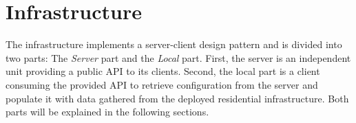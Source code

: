 
\chapter{Infrastructure}
\label{sec:infrastructure}

The infrastructure implements a server-client design pattern and is divided into two parts:
The \emph{Server} part and the \emph{Local} part.
First, the server is an independent unit providing a public API to its clients.
Second, the local part is a client consuming the provided API to retrieve configuration from the server and populate it with data gathered from the deployed residential infrastructure.
Both parts will be explained in the following sections.




